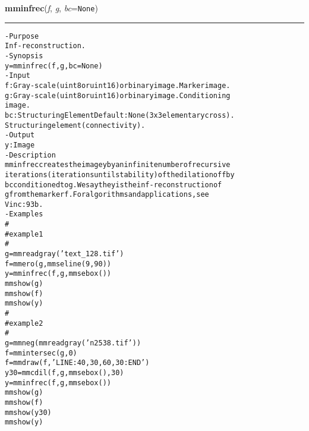     \label{multireg:num_pymorph:mminfrec}
    \vspace{0.5ex}

    \begin{boxedminipage}{\textwidth}

    \raggedright \textbf{mminfrec}(\textit{f}, \textit{g}, \textit{bc}=\texttt{N\-o\-n\-e\-})

    \vspace{-1.5ex}

    \rule{\textwidth}{0.5\fboxrule}
\begin{alltt}
- Purpose
    Inf-reconstruction.
- Synopsis
    y = mminfrec(f, g, bc=None)
- Input
    f:  Gray-scale (uint8 or uint16) or binary image. Marker image.
    g:  Gray-scale (uint8 or uint16) or binary image. Conditioning
        image.
    bc: Structuring Element Default: None (3x3 elementary cross).
        Structuring element ( connectivity).
- Output
    y: Image
- Description
    mminfrec creates the image y by an infinite number of recursive
    iterations (iterations until stability) of the dilation of f by
    bc conditioned to g . We say the y is the inf-reconstruction of
    g from the marker f . For algorithms and applications, see
    Vinc:93b .
- Examples
    \#
    \#   example 1
    \#
    g=mmreadgray('text\_128.tif')
    f=mmero(g,mmseline(9,90))
    y=mminfrec(f,g,mmsebox())
    mmshow(g)
    mmshow(f)
    mmshow(y)
    \#
    \#   example 2
    \#
    g=mmneg(mmreadgray('n2538.tif'))
    f=mmintersec(g,0)
    f=mmdraw(f,'LINE:40,30,60,30:END')
    y30=mmcdil(f,g,mmsebox(),30)
    y=mminfrec(f,g,mmsebox())
    mmshow(g)
    mmshow(f)
    mmshow(y30)
    mmshow(y)\end{alltt}

    \vspace{1ex}

    \end{boxedminipage}

    \label{multireg:num_pymorph:mminpos}
    \vspace{0.5ex}

